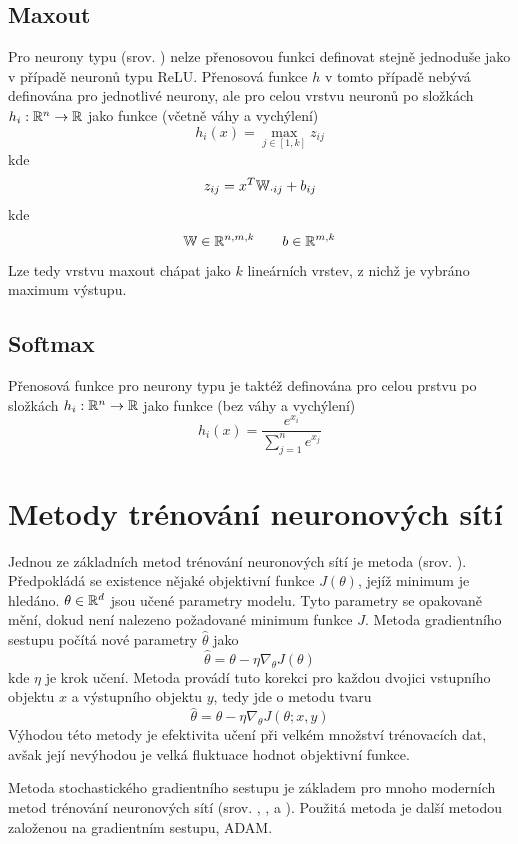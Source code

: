 \subsection{Maxout}
Pro neurony typu  (srov. \cite{goodfellow_maxout_2013}) nelze přenosovou funkci definovat stejně jednoduše jako v případě neuronů typu ReLU. Přenosová funkce \( h \) v tomto případě nebývá definována pro jednotlivé neurony, ale pro celou vrstvu neuronů po složkách \( h_i : \mathbb R^n \to \mathbb R \) jako funkce (včetně váhy a vychýlení)
\[ h_i \left( x \right) = \max_{j \in \left[ 1, k \right]} z_{ij} \]
kde
\[ z_{ij} = x^T \mathbb W_{\cdot ij} + b_{ij} \]
kde
\[ \mathbb W \in \mathbb R^{n, m, k} \qquad b \in \mathbb R^{m, k} \]
Lze tedy vrstvu maxout chápat jako \( k \) lineárních vrstev, z nichž je vybráno maximum výstupu.

\subsection{Softmax}
Přenosová funkce pro neurony typu  je taktéž definována pro celou prstvu po složkách \( h_i : \mathbb R^n \to \mathbb R \) jako funkce (bez váhy a vychýlení)
\[ h_i \left( x \right) = \frac{e^{x_i}}{\sum_{j = 1}^n e^{x_j}} \]

\section{Metody trénování neuronových sítí}
Jednou ze základních metod trénování neuronových sítí je metoda  (srov. \cite{cauchy_methode_1847}). Předpokládá se existence nějaké objektivní funkce \( J \left( \theta \right) \), jejíž minimum je hledáno. \( \theta \in \mathbb R^d \) jsou učené parametry modelu. Tyto parametry se opakovaně mění, dokud není nalezeno požadované minimum funkce \( J \). Metoda gradientního sestupu počítá nové parametry \( \hat \theta \) jako
\[ \hat \theta = \theta - \eta \nabla_{\theta} J \left( \theta \right) \]
kde \( \eta \) je krok učení. Metoda  provádí tuto korekci pro každou dvojici vstupního objektu \( x \) a výstupního objektu \( y \), tedy jde o metodu tvaru
\[ \hat \theta = \theta - \eta \nabla_{\theta} J \left( \theta; x, y \right) \]
Výhodou této metody je efektivita učení při velkém množství trénovacích dat, avšak její nevýhodou je velká fluktuace hodnot objektivní funkce.

Metoda stochastického gradientního sestupu je základem pro mnoho moderních metod trénování neuronových sítí (srov. \cite{duchi_adaptive_2011}, \cite{zeiler_adadelta:_2012}, \cite{tieleman_lecture_2012} a \cite{kingma_adam:_2014}). Použitá metoda je další metodou založenou na gradientním sestupu, ADAM.

